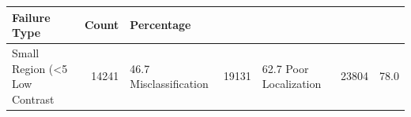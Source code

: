 
\begin{tabular}{lrl}
\toprule
Failure Type & Count & Percentage \\
\midrule
Small Region (<5%
Low Contrast & 14241 & 46.7%
Misclassification & 19131 & 62.7%
Poor Localization & 23804 & 78.0%
\bottomrule
\end{tabular}
